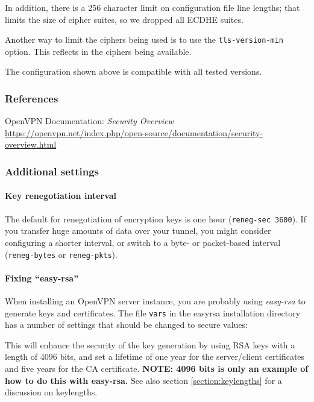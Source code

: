 In addition, there is a 256 character limit on configuration file line
lengths; that limits the size of cipher suites, so we dropped all
ECDHE suites.

Another way to limit the ciphers being used is to use the \verb|tls-version-min|
option. This reflects in the ciphers being available.

The configuration shown above is compatible with all tested versions.


\subsubsection{References}
\begin{itemize*}
  \item OpenVPN Documentation: \emph{Security Overview} \url{https://openvpn.net/index.php/open-source/documentation/security-overview.html}
\end{itemize*}



\subsubsection{Additional settings}

\paragraph{Key renegotiation interval}
The default for renegotiation of encryption keys is one hour
(\verb|reneg-sec 3600|). If you
transfer huge amounts of data over your tunnel, you might consider
configuring a shorter interval, or switch to a byte- or packet-based
interval (\verb|reneg-bytes| or \verb|reneg-pkts|).

\paragraph{Fixing ``easy-rsa''}
When installing an OpenVPN server instance, you are probably using
\emph{easy-rsa} to generate keys and certificates.
The file \verb|vars| in the easyrsa installation directory has a
number of settings that should be changed to secure values:



This will enhance the security of the key generation by using RSA keys
with a length of 4096 bits, and set a lifetime of one year for the
server/client certificates and five years for the CA certificate. \textbf{NOTE: 4096 bits is only an example of how to do this with easy-rsa.} See also section \ref{section:keylengths} for a discussion on keylengths.

